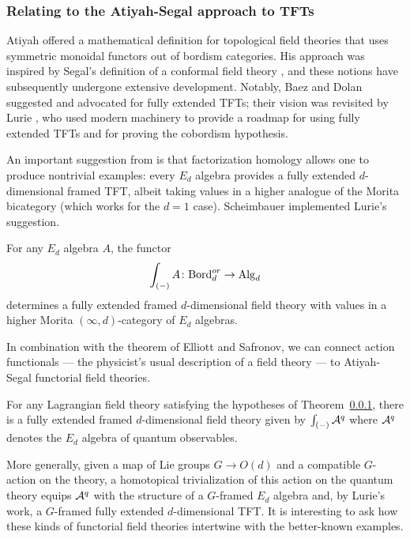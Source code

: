 \documentclass[11pt]{amsart}
\begin{document}
\subsubsection{Relating to the Atiyah-Segal approach to TFTs}

Atiyah \cite{AtiTFT} offered a mathematical definition for topological field theories that uses symmetric monoidal functors out of bordism categories.
His approach was inspired by Segal's definition of a conformal field theory \cite{SegCFT},
and these notions have subsequently undergone extensive development.
Notably, Baez and Dolan \cite{BaeDol} suggested and advocated for fully extended TFTs; 
their vision was revisited by Lurie \cite{LurieTFT}, who used modern machinery to provide a roadmap for using fully extended TFTs and for proving the cobordism hypothesis.

An important suggestion from \cite{LurieTFT} is that factorization homology allows one to produce nontrivial examples: 
every $E_d$ algebra provides a fully extended $d$-dimensional framed TFT,
albeit taking values in a higher analogue of the Morita bicategory (which works for the $d=1$ case).
Scheimbauer \cite{Scheim} implemented Lurie's suggestion.

\begin{thm}
For any $E_d$ algebra $A$, the functor
\[
\int_{(-)} A \colon {\rm Bord}^{or}_d \to {\rm Alg}_d
\]
determines a fully extended framed $d$-dimensional field theory with values in a higher Morita $(\infty,d)$-category of $E_d$ algebras.
\end{thm}

In combination with the theorem of Elliott and Safronov, we can connect action functionals --- the physicist's usual description of a field theory --- to Atiyah-Segal functorial field theories.

\begin{cor}
For any Lagrangian field theory satisfying the hypotheses of Theorem~\ref{}, 
there is a fully extended framed $d$-dimensional field theory 
given by $\int_{(-)} \mathcal A^q$ where $\mathcal A^q$ denotes the $E_d$ algebra of quantum observables.
\end{cor}

More generally, given a map of Lie groups $G \to O(d)$ and a compatible $G$-action on the theory, 
a homotopical trivialization of this action on the quantum theory equips $\mathcal A^q$ with the structure of a $G$-framed $E_d$ algebra and, by Lurie's work, a $G$-framed fully extended $d$-dimensional TFT.
It is interesting to ask how these kinds of functorial field theories intertwine with the better-known examples.
\end{document}
